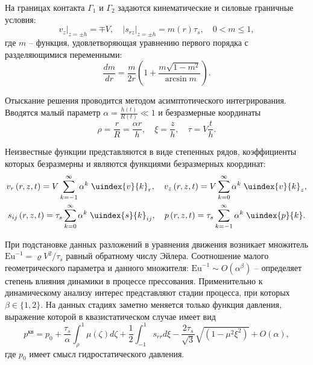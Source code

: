 На границах контакта $\Gamma_1$ и $\Gamma_2$ задаются кинематические и силовые граничные условия:
\begin{equation}
  v_{z}\lvert_{z=\pm h} = \mp V, \quad \lvert s_{rz}\lvert_{z=\pm h} = m(r) \tau_{s}, \quad 0 < m \le 1,
\end{equation}
где $m$ -- функция, удовлетворяющая уравнению первого порядка с разделяющимися переменными:
\begin{equation}
  \frac{dm}{dr}=\frac{m}{2r}\left(1+\frac{m\sqrt{1-m^2}}{\arcsin m}\right).
\end{equation}

Отыскание решения проводится методом асимптотического интегрирования. Вводятся малый параметр $\alpha = \frac{h(t)}{R(t)} \ll 1$ и безразмерные координаты
\begin{equation}
  \rho = \frac{r}{R} = \frac{\alpha r}{h}, \quad \xi = \frac{z}{h}, \quad \tau = V \frac{t}{h}.
\end{equation}

Неизвестные функции представляются в виде степенных рядов, коэффициенты которых безразмерны и являются функциями безразмерных координат:
\begin{gather}
  v_{r}\left(r, z, t\right) = V \sum_{k=-1}^{\infty}{\alpha^{k} \; \uindex{v}{k}_{r}}, \quad v_{z}\left(r, z, t\right) = V \sum_{k=0}^{\infty}{\alpha^{k} \; \uindex{v}{k}_{z}},
  \\
  s_{ij}\left(r, z, t\right) = \tau_{s} \sum_{k=0}^{\infty}{\alpha^{k} \; \uindex{s}{k}_{ij}}, \quad p\left(r, z, t \right) = \tau_{s} \sum_{k=-1}^{\infty}{\alpha^{k} \; \uindex{p}{k}}.
\end{gather}

При подстановке данных разложений в уравнения движения возникает множитель $\text{Eu}^{-1}=\varrho V^2/\tau_s$ равный обратному числу Эйлера. Соотношение малого геометрического параметра и данного множителя: $\text{Eu}^{-1} \sim O(\alpha^\beta)$ -- определяет степень влияния динамики в процессе прессования. Применительно к динамическому анализу интерес представляют стадии процесса, при которых $\beta\in\{1,2\}$.
На данных стадиях заметно меняется только функция давления, выражение которой в квазистатическом случае имеет вид
\begin{equation}
  p^\text{кв} = p_0 + \frac{\tau_{s}}{\alpha}\int_\rho^1 \mu(\zeta) d\zeta + \frac{1}{2}\int_{-1}^{1}s_{rr}d\xi - \frac{2\tau_{s}}{\sqrt{3}} \sqrt{\left(1-\mu^2\xi^2\right)} + O(\alpha),
\end{equation}
где $p_0$ имеет смысл гидростатического давления.

